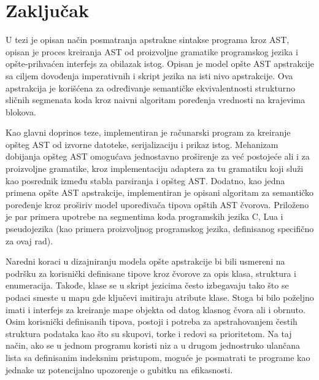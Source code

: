 \chapter{Zaključak}
\label{chp:conclusion}

U tezi je opisan način posmatranja apstrakne sintakse programa kroz AST, opisan je proces kreiranja AST od proizvoljne gramatike programskog jezika i opšte-prihvaćen interfejs za obilazak istog. Opisan je model opšte AST apstrakcije sa ciljem dovođenja imperativnih i skript jezika na isti nivo apstrakcije. Ova apstrakcija je korišćena za određivanje semantičke ekvivalentnosti strukturno sličnih segmenata koda kroz naivni algoritam poređenja vrednosti na krajevima blokova.

Kao glavni doprinos teze, implementiran je računarski program za kreiranje opšteg AST od izvorne datoteke, serijalizaciju i prikaz istog. Mehanizam dobijanja opšteg AST omogućava jednostavno proširenje za već postojeće ali i za proizvoljne gramatike, kroz implementaciju adaptera za tu gramatiku koji služi kao posrednik između stabla parsiranja i opšteg AST. Dodatno, kao jedna primena opšte AST apstrakcije, implementiran je opisani algoritam za semantičko poređenje kroz proširiv model upoređivača tipova opštih AST čvorova. Priloženo je par primera upotrebe na segmentima koda programskih jezika C, Lua i pseudojezika (kao primera proizvoljnog programskog jezika, definisanog specifično za ovaj rad).

Naredni koraci u dizajniranju modela opšte apstrakcije bi bili usmereni na podršku za korisnički definisane tipove kroz čvorove za opis klasa, struktura i enumeracija. Takođe, klase se u skript jezicima često izbegavaju tako što se podaci smeste u mapu gde ključevi imitiraju atribute klase. Stoga bi bilo poželjno imati i interfejs za kreiranje mape objekta od datog klasnog čvora ali i obrnuto. Osim korisnički definisanih tipova, postoji i potreba za apstrahovanjem čestih struktura podataka kao što su skupovi, torke i redovi sa prioritetom. Na taj način, ako se u jednom programu koristi niz a u drugom jednostruko ulančana lista sa definisanim indeksnim pristupom, moguće je posmatrati te programe kao jednake uz potencijalno upozorenje o gubitku na efikasnosti.
